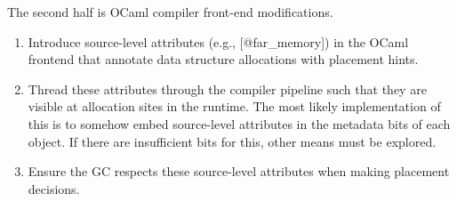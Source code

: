 \documentclass[sigconf]{acmart}
\begin{document}
The second half is OCaml compiler front-end modifications.
\begin{enumerate}
  \item Introduce source-level attributes (e.g., [@far\_memory]) in the OCaml frontend that annotate data structure allocations with placement hints.
  \item Thread these attributes through the compiler pipeline such that they are visible at allocation sites in the runtime. The most likely implementation of this is to somehow embed source-level attributes in the metadata bits of each object. If there are insufficient bits for this, other means must be explored.
  \item Ensure the GC respects these source-level attributes when making placement decisions.
\end{enumerate}
\end{document}
